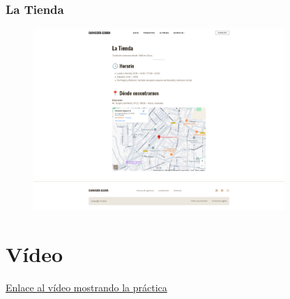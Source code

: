 \documentclass[a4paper]{article}
\begin{document}
\subsubsection{La Tienda}
\begin{figure}[H]
    \centering
    \includegraphics[width=0.85\textwidth]{images/shop.png}
\end{figure}


\section{Vídeo}

\href{https://drive.google.com/file/d/1E2T5aiZRP-RegQDz_RJMtYyBGyNKR_c_/view?usp=sharing}{Enlace al vídeo mostrando la práctica}
\end{document}

